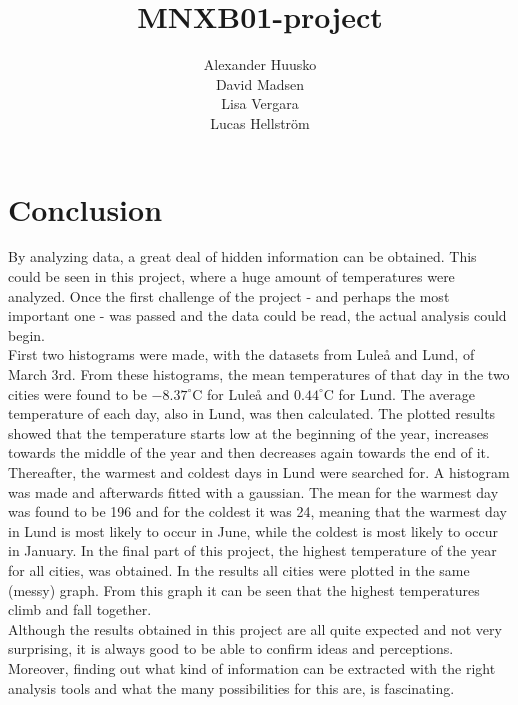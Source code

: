 \documentclass{article}
\begin{document}
\title{MNXB01-project}
\author{Alexander Huusko \\
		David Madsen \\
		Lisa Vergara \\
		Lucas Hellström}
\date{ }
 
 
\maketitle
\thispagestyle{empty}
\clearpage

\tableofcontents
\thispagestyle{empty}
\clearpage






 




\section{Conclusion}

By analyzing data, a great deal of hidden information can be obtained. This could be 
seen in this project, where a huge amount of temperatures were analyzed. Once the 
first challenge of the project - and perhaps the most important one - was passed and the 
data could be read, the actual analysis could begin. \\

\noindent First two histograms were made, with 
the datasets from Luleå and Lund, of March 3rd. From these histograms, the mean 
temperatures of that day in the two cities were found to be $-8.37^\circ$C for Luleå and 
$0.44^\circ$C for Lund. The average temperature of each day, also in Lund, was then calculated.
The plotted results showed that the temperature starts low at the beginning of the year, 
increases towards the middle of the year and then decreases again towards the end of it. 
Thereafter, the warmest and coldest days in Lund 
were searched for. A histogram was made and afterwards fitted with a gaussian. The mean
for the warmest day was found to be 196 and for the coldest it was 24, meaning that the 
warmest day in Lund is most likely to occur in June, while the coldest is most likely 
to occur in January. 
In the final part of this project, the highest temperature of the year for all cities, 
was obtained. In the results all cities were plotted in the same (messy) graph. From this
graph it can be seen that the highest temperatures climb and fall together. \\ 


\noindent Although the results obtained in this project are all quite expected and not very 
surprising, it is always good to be able to confirm ideas and perceptions. Moreover, finding 
out what kind of information can be extracted with the right analysis tools and what the many
possibilities for this are, is fascinating. 

 
\end{document}
